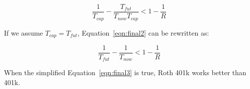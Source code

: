 \documentclass[twocolumn]{article}
\begin{document}
\begin{equation}
  \frac{1}{T_{cap}} - \frac{T_{fut}}{T_{now}T_{cap}} < 1 - \frac{1}{R}  \label{eqn:final2}
\end{equation}


If we assume $T_{cap} = T_{fut}$, Equation~\ref{eqn:final2} can be rewritten as:

\begin{equation}
  \frac{1}{T_{fut}} - \frac{1}{T_{now}} < 1 - \frac{1}{R} \label{eqn:final3}
\end{equation}

When the simplified Equation~\ref{eqn:final3} is true, Roth 401k works better than 401k.
\end{document}
